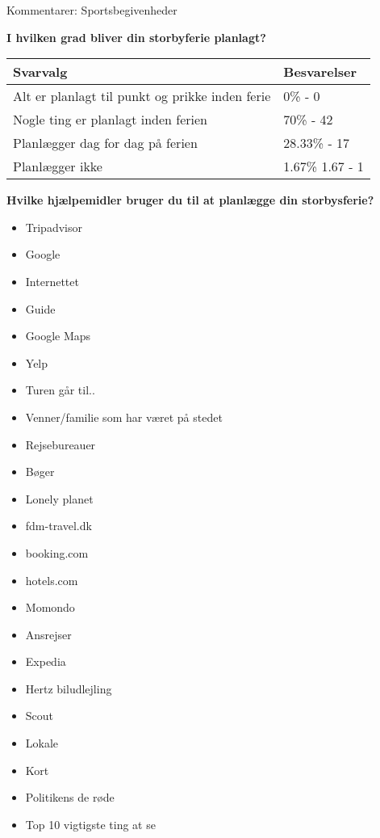 Kommentarer:
Sportsbegivenheder\newline

\textbf{I hvilken grad bliver din storbyferie planlagt?}

    \begin{tabular}{| l | l |}
    \hline
    Svarvalg & Besvarelser \\ \hline
    Alt er planlagt til punkt og prikke inden ferie & 0\% - 0 \\ \hline
    Nogle ting er planlagt inden ferien & 70\% - 42 \\ \hline
    Planlægger dag for dag på ferien & 28.33\% - 17 \\ \hline
    Planlægger ikke & 1.67\% 1.67 - 1 \\
    \hline
    \end{tabular}
\newline
\newline

\textbf{Hvilke hjælpemidler bruger du til at planlægge din storbysferie?}

\begin{itemize}
	\item Tripadvisor
	\item Google
	\item Internettet
	\item Guide
	\item Google Maps
	\item Yelp
	\item Turen går til..
	\item Venner/familie som har været på stedet
	\item Rejsebureauer
	\item Bøger
	\item Lonely planet
	\item fdm-travel.dk
	\item booking.com
	\item hotels.com
	\item Momondo
	\item Ansrejser
	\item Expedia
	\item Hertz biludlejling
	\item Scout
	\item Lokale
	\item Kort
	\item Politikens de røde
	\item Top 10 vigtigste ting at se\newline
	
\end{itemize}


